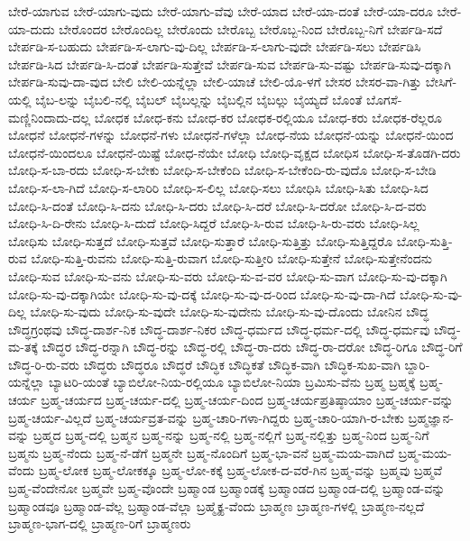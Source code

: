 {ಬೇರೆ-ಯಾಗುವ
ಬೇರೆ-ಯಾಗು-ವುದು
ಬೇರೆ-ಯಾಗು-ವೆವು
ಬೇರೆ-ಯಾದ
ಬೇರೆ-ಯಾ-ದಂತೆ
ಬೇರೆ-ಯಾ-ದರೂ
ಬೇರೆ-ಯಾ-ದುದು
ಬೇರೊಂದರ
ಬೇರೊಂದಿಲ್ಲ
ಬೇರೊಂದು
ಬೇರೊಬ್ಬ
ಬೇರೊಬ್ಬ-ನಿಂದ
ಬೇರೊಬ್ಬ-ನಿಗೆ
ಬೇರ್ಪಡಿ-ಸದೆ
ಬೇರ್ಪಡಿ-ಸ-ಬಹುದು
ಬೇರ್ಪಡಿ-ಸ-ಲಾಗು-ವು-ದಿಲ್ಲ
ಬೇರ್ಪಡಿ-ಸ-ಲಾಗು-ವುದೇ
ಬೇರ್ಪಡಿ-ಸಲು
ಬೇರ್ಪಡಿಸಿ
ಬೇರ್ಪಡಿ-ಸಿದ
ಬೇರ್ಪಡಿ-ಸಿ-ದಂತೆ
ಬೇರ್ಪಡಿ-ಸುತ್ತೇವೆ
ಬೇರ್ಪಡಿ-ಸುವ
ಬೇರ್ಪಡಿ-ಸು-ವಷ್ಟು
ಬೇರ್ಪಡಿ-ಸುವು-ದಕ್ಕಾಗಿ
ಬೇರ್ಪಡಿ-ಸುವು-ದಾ-ವುದ
ಬೇಲಿ
ಬೇಲಿ-ಯನ್ನೆಲ್ಲಾ
ಬೇಲಿ-ಯಾಚೆ
ಬೇಲಿ-ಯೊ-ಳಗೆ
ಬೇಸರ
ಬೇಸರ-ವಾ-ಗಿತ್ತು
ಬೇಸಿಗೆ-ಯಲ್ಲಿ
ಬೈಬ-ಲನ್ನು
ಬೈಬಲಿ-ನಲ್ಲಿ
ಬೈಬಲ್
ಬೈಬಲ್ಲನ್ನು
ಬೈಬಲ್ಲಿನ
ಬೈಬಲ್ಲು
ಬೈಯ್ಯದೆ
ಬೊಂತೆ
ಬೊಗಸೆ-ಮಣ್ಣಿನಿಂದಾದು-ದಲ್ಲ
ಬೋಧಕ
ಬೋಧ-ಕನು
ಬೋಧ-ಕರ
ಬೋಧಕ-ರಲ್ಲಿಯೂ
ಬೋಧ-ಕರು
ಬೋಧಕ-ರೆಲ್ಲರೂ
ಬೋಧನೆ
ಬೋಧನೆ-ಗಳನ್ನು
ಬೋಧನೆ-ಗಳು
ಬೋಧನೆ-ಗಳೆಲ್ಲಾ
ಬೋಧ-ನೆಯ
ಬೋಧನೆ-ಯನ್ನು
ಬೋಧನೆ-ಯಿಂದ
ಬೋಧನೆ-ಯಿಂದಲೂ
ಬೋಧನೆ-ಯಿಷ್ಟೆ
ಬೋಧ-ನೆಯೇ
ಬೋಧಿ
ಬೋಧಿ-ವೃಕ್ಷದ
ಬೋಧಿಸ
ಬೋಧಿ-ಸ-ತೊಡಗಿ-ದರು
ಬೋಧಿ-ಸ-ಬಾ-ರದು
ಬೋಧಿ-ಸ-ಬೇಕು
ಬೋಧಿ-ಸ-ಬೇಕೆಂದಿ
ಬೋಧಿ-ಸ-ಬೇಕೆಂದಿ-ರು-ವುದೊ
ಬೋಧಿ-ಸ-ಬೇಡಿ
ಬೋಧಿ-ಸ-ಲಾ-ಗಿದೆ
ಬೋಧಿ-ಸ-ಲಾರಿರಿ
ಬೋಧಿ-ಸ-ಲಿಲ್ಲ
ಬೋಧಿ-ಸಲು
ಬೋಧಿಸಿ
ಬೋಧಿ-ಸಿತು
ಬೋಧಿ-ಸಿದ
ಬೋಧಿ-ಸಿ-ದಂತೆ
ಬೋಧಿ-ಸಿ-ದನು
ಬೋಧಿ-ಸಿ-ದರು
ಬೋಧಿ-ಸಿ-ದರೆ
ಬೋಧಿ-ಸಿ-ದರೋ
ಬೋಧಿ-ಸಿ-ದ-ವರು
ಬೋಧಿ-ಸಿ-ದಿ-ರೇನು
ಬೋಧಿ-ಸಿ-ದುದೆ
ಬೋಧಿ-ಸಿದ್ದರೆ
ಬೋಧಿ-ಸಿ-ರುವ
ಬೋಧಿ-ಸಿ-ರು-ವರು
ಬೋಧಿ-ಸಿಲ್ಲ
ಬೋಧಿಸು
ಬೋಧಿ-ಸುತ್ತದೆ
ಬೋಧಿ-ಸುತ್ತವೆ
ಬೋಧಿ-ಸುತ್ತಾರೆ
ಬೋಧಿ-ಸುತ್ತಿತ್ತು
ಬೋಧಿ-ಸುತ್ತಿದ್ದರೊ
ಬೋಧಿ-ಸುತ್ತಿ-ರುವ
ಬೋಧಿ-ಸುತ್ತಿ-ರುವನು
ಬೋಧಿ-ಸುತ್ತಿ-ರುವಾಗ
ಬೋಧಿ-ಸುತ್ತೀರಿ
ಬೋಧಿ-ಸುತ್ತೇನೆ
ಬೋಧಿ-ಸುತ್ತೇನೆಂದನು
ಬೋಧಿ-ಸುವ
ಬೋಧಿ-ಸು-ವನು
ಬೋಧಿ-ಸು-ವರು
ಬೋಧಿ-ಸು-ವ-ವರ
ಬೋಧಿ-ಸು-ವಾಗ
ಬೋಧಿ-ಸು-ವು-ದಕ್ಕಾಗಿ
ಬೋಧಿ-ಸು-ವು-ದಕ್ಕಾಗಿಯೇ
ಬೋಧಿ-ಸು-ವು-ದಕ್ಕೆ
ಬೋಧಿ-ಸು-ವು-ದ-ರಿಂದ
ಬೋಧಿ-ಸು-ವು-ದಾ-ಗಿದೆ
ಬೋಧಿ-ಸು-ವು-ದಿಲ್ಲ
ಬೋಧಿ-ಸು-ವುದು
ಬೋಧಿ-ಸು-ವುದೇ
ಬೋಧಿ-ಸು-ವುದೇನು
ಬೋಧಿ-ಸು-ವು-ದೊಂದು
ಬೋನಿನ
ಬೌದ್ಧ
ಬೌದ್ಧಗ್ರಂಥವು
ಬೌದ್ಧ-ದಾರ್ಶ-ನಿಕ
ಬೌದ್ಧ-ದಾರ್ಶ-ನಿಕರ
ಬೌದ್ಧ-ಧರ್ಮದ
ಬೌದ್ಧ-ಧರ್ಮ-ದಲ್ಲಿ
ಬೌದ್ಧ-ಧರ್ಮವು
ಬೌದ್ಧ-ಮ-ತಕ್ಕೆ
ಬೌದ್ಧರ
ಬೌದ್ಧ-ರನ್ನಾಗಿ
ಬೌದ್ಧ-ರನ್ನು
ಬೌದ್ಧ-ರಲ್ಲಿ
ಬೌದ್ಧ-ರಾ-ದರು
ಬೌದ್ಧ-ರಾ-ದರೋ
ಬೌದ್ಧ-ರಿಗೂ
ಬೌದ್ಧ-ರಿಗೆ
ಬೌದ್ಧ-ರಿ-ರು-ವರು
ಬೌದ್ಧರು
ಬೌದ್ಧರೂ
ಬೌದ್ಧರೆ
ಬೌದ್ಧಿಕ
ಬೌದ್ಧಿಕತೆ
ಬೌದ್ಧಿಕ-ವಾಗಿ
ಬೌದ್ಧಿಕ-ಸುಖ-ವಾಗಿ
ಬ್ದಾರಿ-ಯನ್ನೆಲ್ಲಾ
ಬ್ಯಾಟರಿ-ಯಂತೆ
ಬ್ಯಾಬಿಲೋ-ನಿಯ-ರಲ್ಲಿಯೂ
ಬ್ಯಾಬಿಲೋ-ನಿಯಾ
ಬ್ರಮಿಸು-ವೆನು
ಬ್ರಹ್ಮ
ಬ್ರಹ್ಮಕ್ಕೆ
ಬ್ರಹ್ಮ-ಚರ್ಯ
ಬ್ರಹ್ಮ-ಚರ್ಯದ
ಬ್ರಹ್ಮ-ಚರ್ಯ-ದಲ್ಲಿ
ಬ್ರಹ್ಮ-ಚರ್ಯ-ದಿಂದ
ಬ್ರಹ್ಮ-ಚರ್ಯಪ್ರತಿಷ್ಠಾಯಾಂ
ಬ್ರಹ್ಮ-ಚರ್ಯ-ವನ್ನು
ಬ್ರಹ್ಮ-ಚರ್ಯ-ವಿಲ್ಲದೆ
ಬ್ರಹ್ಮ-ಚರ್ಯವ್ರತ-ವನ್ನು
ಬ್ರಹ್ಮ-ಚಾರಿ-ಗಳಾ-ಗಿದ್ದರು
ಬ್ರಹ್ಮ-ಚಾರಿ-ಯಾಗಿ-ರ-ಬೇಕು
ಬ್ರಹ್ಮಜ್ಞಾನ-ವನ್ನು
ಬ್ರಹ್ಮದ
ಬ್ರಹ್ಮ-ದಲ್ಲಿ
ಬ್ರಹ್ಮನ
ಬ್ರಹ್ಮ-ನನ್ನು
ಬ್ರಹ್ಮ-ನಲ್ಲಿ
ಬ್ರಹ್ಮ-ನಲ್ಲಿಗೆ
ಬ್ರಹ್ಮ-ನಲ್ಲಿತ್ತು
ಬ್ರಹ್ಮ-ನಿಂದ
ಬ್ರಹ್ಮ-ನಿಗೆ
ಬ್ರಹ್ಮನು
ಬ್ರಹ್ಮ-ನೆಂದು
ಬ್ರಹ್ಮ-ನೆ-ಡೆಗೆ
ಬ್ರಹ್ಮನೇ
ಬ್ರಹ್ಮ-ನೊಂದಿಗೆ
ಬ್ರಹ್ಮ-ಭಾ-ವನೆ
ಬ್ರಹ್ಮ-ಮಯ-ವಾಗಿದೆ
ಬ್ರಹ್ಮ-ಮಯ-ವೆಂದು
ಬ್ರಹ್ಮ-ಲೋಕ
ಬ್ರಹ್ಮ-ಲೋಕಕ್ಕೂ
ಬ್ರಹ್ಮ-ಲೋ-ಕಕ್ಕೆ
ಬ್ರಹ್ಮ-ಲೋಕ-ದ-ವರೆ-ಗಿನ
ಬ್ರಹ್ಮ-ವನ್ನು
ಬ್ರಹ್ಮವು
ಬ್ರಹ್ಮವೆ
ಬ್ರಹ್ಮ-ವೆಂದೇನೋ
ಬ್ರಹ್ಮವೇ
ಬ್ರಹ್ಮ-ವೊಂದೇ
ಬ್ರಹ್ಮಾಂಡ
ಬ್ರಹ್ಮಾಂಡಕ್ಕೆ
ಬ್ರಹ್ಮಾಂಡದ
ಬ್ರಹ್ಮಾಂಡ-ದಲ್ಲಿ
ಬ್ರಹ್ಮಾಂಡ-ವನ್ನು
ಬ್ರಹ್ಮಾಂಡವೂ
ಬ್ರಹ್ಮಾಂಡ-ವೆಲ್ಲ
ಬ್ರಹ್ಮಾಂಡ-ವೆಲ್ಲಾ
ಬ್ರಹ್ಮೈಕ್ಯ-ವೆಂದು
ಬ್ರಾಹ್ಮಣ
ಬ್ರಾಹ್ಮಣ-ಗಳಲ್ಲಿ
ಬ್ರಾಹ್ಮಣ-ನಲ್ಲದೆ
ಬ್ರಾಹ್ಮಣ-ಭಾಗ-ದಲ್ಲಿ
ಬ್ರಾಹ್ಮಣ-ರಿಗೆ
ಬ್ರಾಹ್ಮಣರು
}
